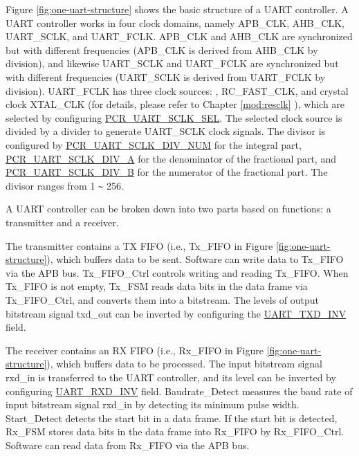 \documentclass[main\_\_EN.tex]{subfiles}
\begin{document}
Figure \ref{fig:one-uart-structure} shows the basic structure of a UART controller. A UART controller works in four clock domains, namely APB\_CLK, AHB\_CLK, UART\_SCLK, and UART\_FCLK. APB\_CLK and AHB\_CLK are synchronized but with different frequencies (APB\_CLK is derived from AHB\_CLK by division), and likewise UART\_SCLK and UART\_FCLK are synchronized but with different frequencies (UART\_SCLK is derived from UART\_FCLK by division). UART\_FCLK has three clock sources: , RC\_FAST\_CLK, and crystal clock XTAL\_CLK (for details, please refer to Chapter \ref{mod:resclk} \textit{}), which are selected by configuring \hyperref[fielddesc:PCRUART0SCLKSEL]{PCR\_UART\_SCLK\_SEL}. The selected clock source is divided by a divider to generate UART\_SCLK clock signals. The divisor is configured by \hyperref[fielddesc:PCRUART0SCLKDIVNUM]{PCR\_UART\_SCLK\_DIV\_NUM} for the integral part, \hyperref[fielddesc:PCRUART0SCLKDIVA]{PCR\_UART\_SCLK\_DIV\_A} for the denominator of the fractional part, and \hyperref[fielddesc:PCRUART0SCLKDIVB]{PCR\_UART\_SCLK\_DIV\_B} for the numerator of the fractional part. The divisor ranges from 1 \verb+~+ 256.


A UART controller can be broken down into two parts based on functions: a transmitter and a receiver.

The transmitter contains a TX FIFO (i.e., Tx\_FIFO in Figure \ref{fig:one-uart-structure}), which buffers data to be sent. Software can write data to Tx\_FIFO via the APB bus. Tx\_FIFO\_Ctrl controls writing and reading Tx\_FIFO. When Tx\_FIFO is not empty, Tx\_FSM reads data bits in the data frame via Tx\_FIFO\_Ctrl, and converts them into a bitstream. The levels of output bitstream signal txd\_out can be inverted by configuring the \hyperref[fielddesc:UARTTXDINV]{UART\_TXD\_INV} field.

The receiver contains an RX FIFO (i.e., Rx\_FIFO in Figure \ref{fig:one-uart-structure}), which buffers data to be processed. The input bitstream signal rxd\_in is transferred to the UART controller, and its level can be inverted by configuring \hyperref[fielddesc:UARTRXDINV]{UART\_RXD\_INV} field. Baudrate\_Detect measures the baud rate of input bitstream signal rxd\_in by detecting its minimum pulse width. Start\_Detect detects the start bit in a data frame. If the start bit is detected, Rx\_FSM stores data bits in the data frame into Rx\_FIFO by Rx\_FIFO\_Ctrl. Software can read data from Rx\_FIFO via the APB bus.
\end{document}
